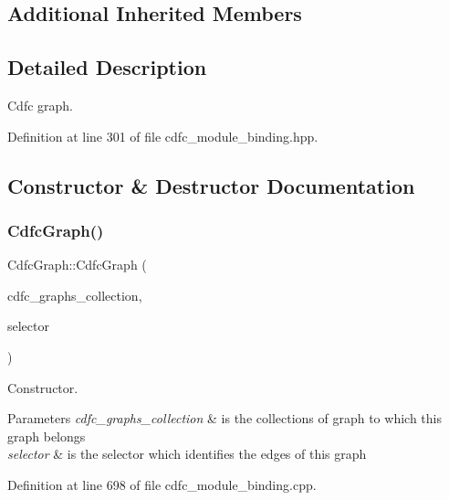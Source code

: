 \subsection*{Additional Inherited Members}


\subsection{Detailed Description}
Cdfc graph. 

Definition at line 301 of file cdfc\+\_\+module\+\_\+binding.\+hpp.



\subsection{Constructor \& Destructor Documentation}
\mbox{\label{classCdfcGraph_abf5ddb6772ee79d04c35dfbe9ab54b0a}} 
\subsubsection{\texorpdfstring{Cdfc\+Graph()}{CdfcGraph()}\hspace{0.1cm}{\footnotesize\ttfamily [1/2]}}
{\footnotesize\ttfamily Cdfc\+Graph\+::\+Cdfc\+Graph (\begin{DoxyParamCaption}\item[{const \hyperlink{cdfc__module__binding_8hpp_aa8241ce8a2e9cbbcde3671221c69040a}{Cdfc\+Graphs\+Collection\+Ref}}]{cdfc\+\_\+graphs\+\_\+collection,  }\item[{const int}]{selector }\end{DoxyParamCaption})}



Constructor. 


\begin{DoxyParams}{Parameters}
{\em cdfc\+\_\+graphs\+\_\+collection} & is the collections of graph to which this graph belongs \\
\hline
{\em selector} & is the selector which identifies the edges of this graph \\
\hline
\end{DoxyParams}


Definition at line 698 of file cdfc\+\_\+module\+\_\+binding.\+cpp.

\mbox{\label{classCdfcGraph_ada9310c8cca38c92987b67c072d7b8d5}} 
